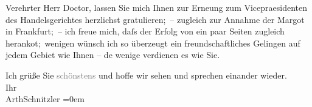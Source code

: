 \pstart{}Verehrter Herr Doctor,\pend\vspace{0.5em}
\pstart
           lassen Sie mich Ihnen zur Erne{\geminationn}ung zum Vicepraesidenten
               des Handelsgerichtes herzlichst gratulieren; –
               zugleich zur Annahme der Margot in Frankfurt; – ich freue mich, daſs der Erfolg von
               ein paar Seiten zugleich heranko{\geminationm}t; wenigen wünsch ich
               so überzeugt ein freundschaftliches Gelingen auf jedem Gebiet wie Ihnen – de{\geminationn} wenige verdienen es wie Sie.\pend
           
\pstart
           Ich grüße Sie \textcolor{gray}{schönstens} und hoffe wir sehen und sprechen
               einander wieder.{\\[\baselineskip]}Ihr{\\[\baselineskip]}\spacefill\mbox{ArthSchnitzler}\pend
           \leftskip=0em{}\endnumbering{}  \newcommand{\dateiname}{L02536}\newcommand{\titel}{Arthur Schnitzler an Robert Adam, 12. 6. 1930}\newcommand{\editorInnen}{Martin Anton Müller und Gerd-Hermann Susen}
